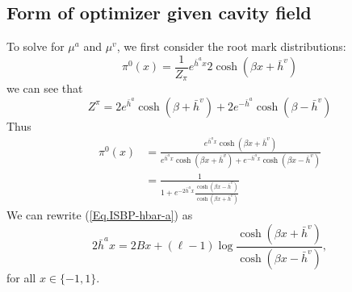\documentclass[12pt]{article}
\numberwithin{equation}{section}
\begin{document}
\newpage

\subsection{Form of optimizer given cavity field}

To solve for $\mu^a$ and $\mu^v$, we first consider the root mark distributions:
\begin{equation*}
    \pi^0(x) = \frac1{Z_\pi}e^{\bar{h}^a x} 2\cosh(\beta x + \bar{h}^v)
\end{equation*}
we can see that
\begin{equation*}
    Z^\pi = 2e^{\bar{h}^a}\cosh(\beta + \bar{h}^v) + 2e^{-\bar{h}^a}\cosh(\beta - \bar{h}^v)
\end{equation*}
Thus
\begin{align*}
    \pi^0(x) & = \frac{e^{\bar{h}^a x} \cosh(\beta x + \bar{h}^v)}{e^{\bar{h}^a x}\cosh(\beta x + \bar{h}^v) + e^{-\bar{h}^ax}\cosh(\beta x - \bar{h}^v)} \\
             & = \frac{1}{1 + e^{-2\bar{h}^ax}\frac{\cosh(\beta x - \bar{h}^v)}{\cosh(\beta x + \bar{h}^v)}}
\end{align*}
We can rewrite (\ref{Eq.ISBP-hbar-a}) as
\begin{equation*}
    2\bar{h}^a x = 2 B x + (\ell - 1) \log \frac{\cosh(\beta x + \bar{h}^v)}{\cosh(\beta x - \bar{h}^v)},
\end{equation*}
for all $x\in\{-1, 1\}$.
\end{document}
